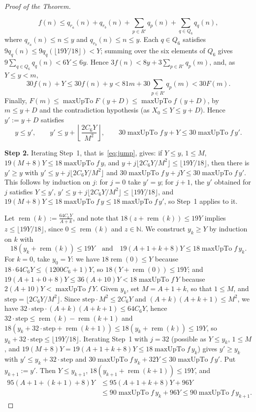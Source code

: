 \documentclass[11pt,a4paper]{amsart}
\newcommand{\maxUpTo}{\operatorname{maxUpTo}}
\newcommand{\rem}{\operatorname{rem}}
\newcommand{\step}{\mathrm{step}}
\begin{document}
\begin{proof}[Proof of the Theorem]
\begin{itemize}
\[
f(n) \le q_{r_a}(n) + q_{r_b}(n) + \sum_{p \in R'} q_p(n) + \sum_{q \in Q_6} q_q(n),
\]
where $q_{r_a}(n) \le n \le y$ and $q_{r_b}(n) \le n \le y$. Each $q \in Q_6$ satisfies $9 q_q(n) \le 9 q_q(\lfloor 19 Y / 18 \rfloor) < Y$; summing over the six elements of $Q_6$ gives $9 \sum_{q \in Q_6} q_q(n) < 6 Y \le 6 y$. Hence $3 f(n) < 8 y + 3 \sum_{p \in R'} q_p(m)$, and, as $Y \le y < m$,
\[
30 f(n) + Y \le 30 f(n) + y < 81 m + 30 \sum_{p \in R'} q_p(m) < 30 F(m).
\]
Finally, $F(m) \le \maxUpTo F\,(y + D) \le \maxUpTo f\,(y + D)$, by $m \le y + D$ and the contradiction hypothesis (as $X_0 \le Y \le y + D$). Hence $y' := y + D$ satisfies
\begin{equation}\label{eq:jump}
y \le y', \qquad y' \le y + \left\lfloor \frac{2 C_6 Y}{M^2} \right\rfloor, \qquad 30 \maxUpTo f\, y + Y \le 30 \maxUpTo f\, y'.
\end{equation}
\end{itemize}

\medskip\noindent\textbf{Step 2.}
Iterating Step~1, that is~\eqref{eq:jump}, gives: if $Y \le y$, $1 \le M$, $19 (M + 8) Y \le 18 \maxUpTo f\, y$, and $y + j \lfloor 2 C_6 Y / M^2 \rfloor \le \lfloor 19 Y / 18 \rfloor$, then there is $y' \ge y$ with $y' \le y + j \lfloor 2 C_6 Y / M^2 \rfloor$ and $30 \maxUpTo f\, y + j Y \le 30 \maxUpTo f\, y'$. This follows by induction on $j$: for $j = 0$ take $y' = y$; for $j + 1$, the $y'$ obtained for $j$ satisfies $Y \le y'$, $y' \le y + j \lfloor 2 C_6 Y / M^2 \rfloor \le \lfloor 19 Y / 18 \rfloor$, and $19 (M + 8) Y \le 18 \maxUpTo f\, y \le 18 \maxUpTo f\, y'$, so Step~1 applies to it.

Let $\rem(k) := \frac{64 C_6 Y}{A + k}$, and note that $18(z + \rem(k)) \le 19 Y$ implies $z \le \lfloor 19 Y / 18 \rfloor$, since $0 \le \rem(k)$ and $z \in \mathbb{N}$. We construct $y_k \ge Y$ by induction on $k$ with
\[
18(y_k + \rem(k)) \le 19 Y \quad \text{and} \quad 19(A + 1 + k + 8) Y \le 18 \maxUpTo f\, y_k.
\]
For $k = 0$, take $y_0 = Y$: we have $18 \rem(0) \le Y$ because $18 \cdot 64 C_6 Y \le (1200 C_6 + 1) Y$, so $18(Y + \rem(0)) \le 19 Y$; and $19(A + 1 + 0 + 8) Y \le 36(A + 10) Y < 18 \maxUpTo f\, Y$ because $2(A + 10) Y < \maxUpTo f\, Y$. Given $y_k$, set $M = A + 1 + k$, so that $1 \le M$, and $\step = \lfloor 2 C_6 Y / M^2 \rfloor$. Since $\step \cdot M^2 \le 2 C_6 Y$ and $(A + k)(A + k + 1) \le M^2$, we have $32 \cdot \step \cdot (A + k)(A + k + 1) \le 64 C_6 Y$, hence $32 \cdot \step \le \rem(k) - \rem(k + 1)$ and $18(y_k + 32 \cdot \step + \rem(k + 1)) \le 18(y_k + \rem(k)) \le 19 Y$, so $y_k + 32 \cdot \step \le \lfloor 19 Y / 18 \rfloor$. Iterating Step~1 with $j = 32$ (possible as $Y \le y_k$, $1 \le M$, and $19(M + 8) Y = 19(A + 1 + k + 8) Y \le 18 \maxUpTo f\, y_k$) gives $y' \ge y_k$ with $y' \le y_k + 32 \cdot \step$ and $30 \maxUpTo f\, y_k + 32 Y \le 30 \maxUpTo f\, y'$. Put $y_{k + 1} := y'$. Then $Y \le y_{k + 1}$, $18(y_{k + 1} + \rem(k + 1)) \le 19 Y$, and
\begin{align*}
95(A + 1 + (k + 1) + 8) Y &\le 95(A + 1 + k + 8) Y + 96 Y \\
&\le 90 \maxUpTo f\, y_k + 96 Y \le 90 \maxUpTo f\, y_{k + 1}.
\end{align*}


\end{proof}
\end{document}

